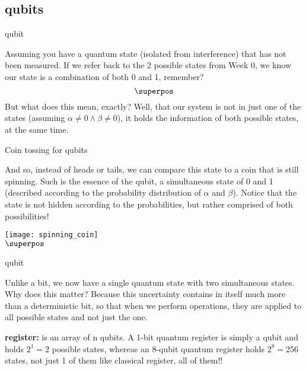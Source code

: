 \documentclass[aspectratio=43]{beamer}
\begin{document}
\subsection{qubits}
\begin{frame}{qubit}
    \begin{card}
    Assuming you have a quantum state (isolated from interference) that has not been measured. If we refer back to the 2 possible states from Week 0, we know our state is a combination of both 0 and 1, remember? \begin{equation*}
        \superpos
    \end{equation*}
    But what does this mean, exactly? Well, that our system is not in just one of the states (assuming $\alpha \neq 0 \wedge \beta \neq 0$), it holds the information of both possible states, at the same time.
    \end{card}
\pagenumber
\end{frame}

\begin{frame}{Coin tossing for qubits}
    \begin{card}
        And so, instead of heads or tails, we can compare this state to a coin that is still spinning. Such is the essence of the qubit, a simultaneous state of 0 and 1 (described according to the probability distribution of $\alpha$ and $\beta$).  Notice that the state is not hidden according to the probabilities, but rather comprised of both possibilities!
    \end{card}
    \begin{center}
        \texttt{[image: spinning\_coin]}
        \\$\superpos$
    \end{center}
\pagenumber
\end{frame}

\begin{frame}{qubit}
    \begin{card}
        Unlike a bit, we now have a single quantum state with two simultaneous states. Why does this matter? Because this uncertainty contains in itself much more than a deterministic bit, so that when we perform operations, they are applied to all possible states and not just the one.
    \end{card}
	\begin{cardTiny}
		\textbf{\q register:} is an array of n qubits. A 1-bit quantum register is simply a qubit and holds $2^1 = 2$ possible states, whereas an 8-qubit quantum register holds $2^8 = 256$ states, not just 1 of them like classical register, all of them!!
	\end{cardTiny}
\pagenumber
\end{frame}
\end{document}
